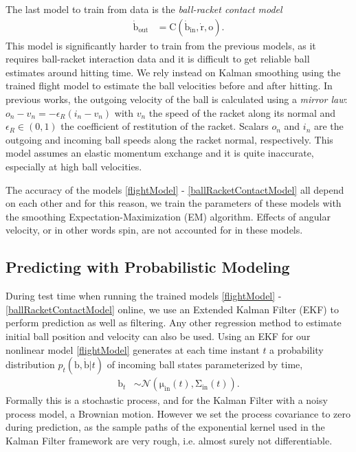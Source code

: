 \documentclass[letterpaper, 10 pt, conference]{ieeeconf}
\newcommand{\boldvec}[1]{\boldsymbol{\mathrm{#1}}}
\let\vec\boldvec
\newcommand{\ball}{\vec{b}} %
\newcommand{\contact}{\vec{C}} %
\newcommand{\racket}{\vec{r}} %
\newcommand{\orient}{\vec{o}} %
\begin{document}

The last model to train from data is the \emph{ball-racket contact model} 
%
\begin{align}
\dot{\ball}_{\mathrm{out}} &= \contact(\dot{\ball}_{\mathrm{in}},\dot{\racket},\orient).
\label{ballRacketContactModel}
\end{align}
%
\noindent This model is significantly harder to train from the previous models, as it requires ball-racket interaction data and it is difficult to get reliable ball estimates around hitting time. We rely instead on Kalman smoothing using the trained flight model to estimate the ball velocities before and after hitting. In previous works, the outgoing velocity of the ball is calculated using a \emph{mirror law}: $o_{n} - v_{n} = -\epsilon_{R} (i_{n} - v_{n})$ with $v_{n}$ the speed of the racket along its normal and $\epsilon_{R} \in (0,1)$ the coefficient of restitution of the racket. Scalars $o_{n}$ and $i_{n}$ are the outgoing and incoming ball speeds along the racket normal, respectively. This model assumes an elastic momentum exchange and it is quite inaccurate, especially at high ball velocities.

The accuracy of the models \eqref{flightModel} - \eqref{ballRacketContactModel} all depend on each other and for this reason, we train the parameters of these models with the smoothing Expectation-Maximization (EM) algorithm. Effects of angular velocity, or in other words spin, are not accounted for in these models.

\subsection{Predicting with Probabilistic Modeling}
 
During test time when running the trained models \eqref{flightModel} - \eqref{ballRacketContactModel} online, we use an Extended Kalman Filter (EKF) to perform prediction as well as filtering. Any other regression method to estimate initial ball position and velocity can also be used.
Using an EKF for our nonlinear model \eqref{flightModel} generates at each time instant $t$ a probability distribution $p_t(\ball,\dot{\ball}|t)$ of incoming ball states parameterized by time, 
%
\begin{align}
\ball_t &\sim \mathcal{N}(\vec{\mu}_{\textrm{in}}(t),\vec{\Sigma}_{\textrm{in}}(t)). 
\end{align}
%
%
\noindent Formally this is a stochastic process, and for the Kalman Filter with a noisy process model, a Brownian motion. However we set the process covariance to zero during prediction, as the sample paths of the exponential kernel used in the Kalman Filter framework are very rough, i.e. almost surely not differentiable.
\end{document}
